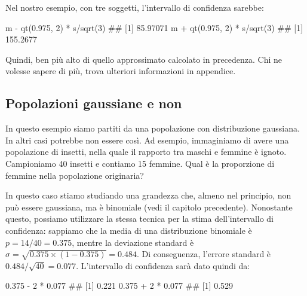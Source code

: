 \documentclass[a4paper,12pt,oneside]{book}
\newenvironment{Shaded}{\begin{snugshade}}{\end{snugshade}}
\newcommand{\DecValTok}[1]{#1}
\newcommand{\FloatTok}[1]{#1}
\newcommand{\SpecialCharTok}[1]{#1}
\newcommand{\DocumentationTok}[1]{#1}
\newcommand{\FunctionTok}[1]{#1}
\newcommand{\NormalTok}[1]{#1}
\begin{document}
Nel nostro esempio, con tre soggetti, l'intervallo di confidenza sarebbe:

\begin{Shaded}
\begin{Highlighting}[]
\NormalTok{m }\SpecialCharTok{{-}} \FunctionTok{qt}\NormalTok{(}\FloatTok{0.975}\NormalTok{, }\DecValTok{2}\NormalTok{) }\SpecialCharTok{*}\NormalTok{ s}\SpecialCharTok{/}\FunctionTok{sqrt}\NormalTok{(}\DecValTok{3}\NormalTok{)}
\DocumentationTok{\#\# [1] 85.97071}
\NormalTok{m }\SpecialCharTok{+} \FunctionTok{qt}\NormalTok{(}\FloatTok{0.975}\NormalTok{, }\DecValTok{2}\NormalTok{) }\SpecialCharTok{*}\NormalTok{ s}\SpecialCharTok{/}\FunctionTok{sqrt}\NormalTok{(}\DecValTok{3}\NormalTok{)}
\DocumentationTok{\#\# [1] 155.2677}
\end{Highlighting}
\end{Shaded}

Quindi, ben più alto di quello approssimato calcolato in precedenza. Chi ne volesse sapere di più, trova ulteriori informazioni in appendice.

\hypertarget{popolazioni-gaussiane-e-non}{%
\subsection{Popolazioni gaussiane e non}\label{popolazioni-gaussiane-e-non}}

In questo esempio siamo partiti da una popolazione con distribuzione gaussiana. In altri casi potrebbe non essere così. Ad esempio, immaginiamo di avere una popolazione di insetti, nella quale il rapporto tra maschi e femmine è ignoto. Campioniamo 40 insetti e contiamo 15 femmine. Qual è la proporzione di femmine nella popolazione originaria?

In questo caso stiamo studiando una grandezza che, almeno nel principio, non può essere gaussiana, ma è binomiale (vedi il capitolo precedente). Nonostante questo, possiamo utilizzare la stessa tecnica per la stima dell'intervallo di confidenza: sappiamo che la media di una distribuzione binomiale è \(p = 14/40 = 0.375\), mentre la deviazione standard è \(\sigma = \sqrt{0.375 \times (1 - 0.375)} = 0.484\). Di conseguenza, l'errore standard è \(0.484 / \sqrt{40} = 0.077\). L'intervallo di confidenza sarà dato quindi da:

\begin{Shaded}
\begin{Highlighting}[]
\FloatTok{0.375} \SpecialCharTok{{-}} \DecValTok{2} \SpecialCharTok{*} \FloatTok{0.077}
\DocumentationTok{\#\# [1] 0.221}
\FloatTok{0.375} \SpecialCharTok{+} \DecValTok{2} \SpecialCharTok{*} \FloatTok{0.077}
\DocumentationTok{\#\# [1] 0.529}
\end{Highlighting}
\end{Shaded}
\end{document}
